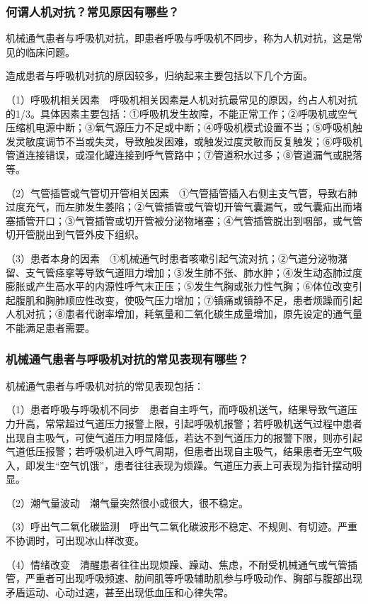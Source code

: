 \subsubsection{何谓人机对抗？常见原因有哪些？}

机械通气患者与呼吸机对抗，即患者呼吸与呼吸机不同步，称为人机对抗，这是常见的临床问题。

造成患者与呼吸机对抗的原因较多，归纳起来主要包括以下几个方面。

（1）呼吸机相关因素　呼吸机相关因素是人机对抗最常见的原因，约占人机对抗的1/3。具体因素主要包括：①呼吸机发生故障，不能正常工作；②呼吸机或空气压缩机电源中断；③氧气源压力不足或中断；④呼吸机模式设置不当；⑤呼吸机触发灵敏度调节不当或失灵，导致触发困难，或触发过度灵敏而反复触发；⑥呼吸机管道连接错误，或湿化罐连接到呼气管路中；⑦管道积水过多；⑧管道漏气或脱落等。

（2）气管插管或气管切开管相关因素　①气管插管插入右侧主支气管，导致右肺过度充气，而左肺发生萎陷；②气管插管或气管切开管气囊漏气，或气囊疝出而堵塞插管开口；③气管插管或切开管被分泌物堵塞；④气管插管脱出到咽部，或气管切开管脱出到气管外皮下组织。

（3）患者本身的因素　①机械通气时患者咳嗽引起气流对抗；②气道分泌物潴留、支气管痉挛等导致气道阻力增加；③发生肺不张、肺水肿；④发生动态肺过度膨胀或产生高水平的内源性呼气末正压；⑤发生气胸或张力性气胸；⑥体位改变引起腹肌和胸肺顺应性改变，使吸气压力增加；⑦镇痛或镇静不足，患者烦躁而引起人机对抗；⑧患者代谢率增加，耗氧量和二氧化碳生成量增加，原先设定的通气量不能满足患者需要。

\subsubsection{机械通气患者与呼吸机对抗的常见表现有哪些？}

机械通气患者与呼吸机对抗的常见表现包括：

（1）患者呼吸与呼吸机不同步　患者自主呼气，而呼吸机送气，结果导致气道压力升高，常常超过气道压力报警上限，引起呼吸机报警；若呼吸机送气过程中患者出现自主吸气，可使气道压力明显降低，若达不到气道压力的报警下限，则亦引起气道低压报警；若呼吸机进入呼气周期，但患者出现自主吸气，结果患者无空气吸入，即发生“空气饥饿”，患者往往表现为烦躁。气道压力表上可表现为指针摆动明显。

（2）潮气量波动　潮气量突然很小或很大，很不稳定。

（3）呼出气二氧化碳监测　呼出气二氧化碳波形不稳定、不规则、有切迹。严重不协调时，可出现冰山样改变。

（4）情绪改变　清醒患者往往出现烦躁、躁动、焦虑，不耐受机械通气或气管插管，严重者可出现呼吸频速、肋间肌等呼吸辅助肌参与呼吸动作、胸部与腹部出现矛盾运动、心动过速，甚至出现低血压和心律失常。

